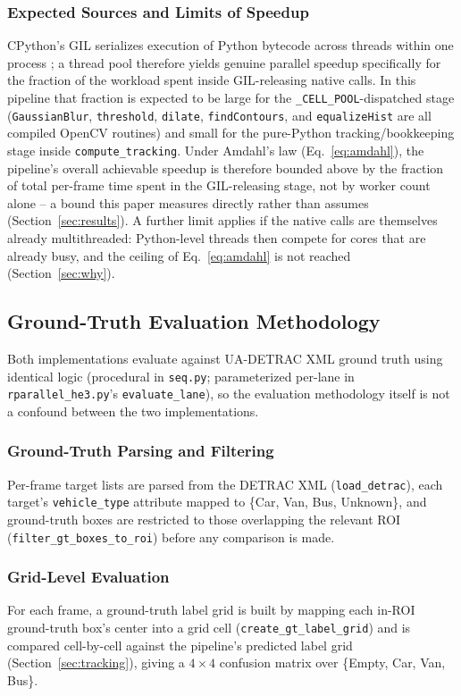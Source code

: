 \documentclass[conference]{IEEEtran}
\newcommand{\code}[1]{\texttt{#1}}
\begin{document}
\subsubsection{Expected Sources and Limits of Speedup}
\label{sec:speedup-limits}
CPython's GIL serializes execution of Python bytecode across threads
within one process \cite{pythongil}; a thread pool therefore yields
genuine parallel speedup specifically for the fraction of the workload
spent inside GIL-releasing native calls. In this pipeline that fraction
is expected to be large for the \code{\_CELL\_POOL}-dispatched stage
(\code{GaussianBlur}, \code{threshold}, \code{dilate},
\code{findContours}, and \code{equalizeHist} are all compiled OpenCV
routines) and small for the pure-Python tracking/bookkeeping stage
inside \code{compute\_tracking}. Under Amdahl's law
(Eq.~\eqref{eq:amdahl}), the pipeline's overall achievable speedup is
therefore bounded above by the fraction of total per-frame time spent in
the GIL-releasing stage, not by worker count alone -- a bound this paper
measures directly rather than assumes (Section~\ref{sec:results}). A
further limit applies if the native calls are themselves already
multithreaded: Python-level threads then compete for cores that are
already busy, and the ceiling of Eq.~\eqref{eq:amdahl} is not reached
(Section~\ref{sec:why}).

\subsection{Ground-Truth Evaluation Methodology}
\label{sec:eval}

Both implementations evaluate against UA-DETRAC XML ground truth
\cite{wen2020} using identical logic (procedural in \code{seq.py};
parameterized per-lane in \code{rparallel\_he3.py}'s
\code{evaluate\_lane}), so the evaluation methodology itself is not a
confound between the two implementations.

\subsubsection{Ground-Truth Parsing and Filtering}
Per-frame target lists are parsed from the DETRAC XML
(\code{load\_detrac}), each target's \code{vehicle\_type} attribute
mapped to \{Car, Van, Bus, Unknown\}, and ground-truth boxes are
restricted to those overlapping the relevant ROI
(\code{filter\_gt\_boxes\_to\_roi}) before any comparison is made.

\subsubsection{Grid-Level Evaluation}
For each frame, a ground-truth label grid is built by mapping each
in-ROI ground-truth box's center into a grid cell
(\code{create\_gt\_label\_grid}) and is compared cell-by-cell against
the pipeline's predicted label grid (Section~\ref{sec:tracking}), giving
a $4\times4$ confusion matrix over \{Empty, Car, Van, Bus\}.
\end{document}
